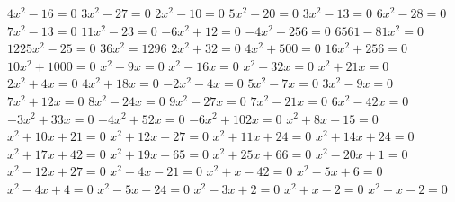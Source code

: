 \documentclass[twocolumns,12pt,addpoints,x11names]{exam}
\begin{document}
\begin{multicols}{2}
\begin{questions}
  \question $4x^{2}-16=0$
  \question $3x^{2}-27=0$
  \question $2x^{2}-10=0$
  \question $5x^{2}-20=0$
  \question $3x^{2}-13=0$
  \question $6x^{2}-28=0$
  \question $7x^{2}-13=0$
  \question $11x^{2}-23=0$
  \question $-6x^{2}+12=0$
  \question $-4x^{2}+256=0$
  \question $6561-81x^{2}=0$
  \question $1225x^{2}-25=0$
  \question $36x^{2}=1296$
  \question $2x^{2}+32=0$
  \question $4x^{2}+500=0$
  \question $16x^{2}+256=0$
  \question $10x^{2}+1000=0$
  \question $x^{2}-9x=0$
  \question $x^{2}-16x=0$
  \question $x^{2}-32x=0$
  \question $x^{2}+21x=0$
  \question $2x^{2}+4x=0$
  \question $4x^{2}+18x=0$
  \question $-2x^{2}-4x=0$
  \question $5x^{2}-7x=0$
  \question $3x^{2}-9x=0$
  \question $7x^{2}+12x=0$
  \question $8x^{2}-24x=0$
  \question $9x^{2}-27x=0$
  \question $7x^{2}-21x=0$
  \question $6x^{2}-42x=0$
  \question $-3x^{2}+33x=0$
  \question $-4x^{2}+52x=0$
  \question $-6x^{2}+102x=0$
  \question $x^{2}+8x+15=0$
  \question $x^{2}+10x+21=0$
  \question $x^{2}+12x+27=0$
  \question $x^{2}+11x+24=0$
  \question $x^{2}+14x+24=0$
  \question $x^{2}+17x+42=0$
  \question $x^{2}+19x+65=0$
  \question $x^{2}+25x+66=0$
  \question $x^{2}-20x+1=0$
  \question $x^{2}-12x+27=0$
  \question $x^{2}-4x-21=0$
  \question $x^{2}+x-42=0$
  \question $x^{2}-5x+6=0$
  \question $x^{2}-4x+4=0$
  \question $x^{2}-5x-24=0$
  \question $x^{2}-3x+2=0$
  \question $x^{2}+x-2=0$
  \question $x^{2}-x-2=0$

\end{questions}
\end{multicols}
\end{document}
